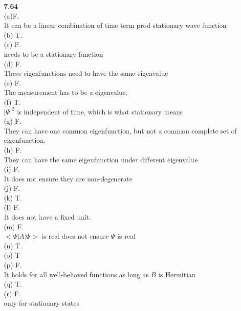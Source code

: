 \documentclass{article}
\begin{document}
\textbf{7.64}\\
(a)F.\\
It can be a linear combination of time term prod stationary wave function\\
(b) T.\\
(c) F.\\
needs to be a stationary function\\
(d) F.\\
These eigenfunctions need to have the same eigenvalue\\
(e) F.\\
The measurement has to be a eigenvalue.\\
(f) T.\\
$|\Psi|^2$ is independent of time, which is what stationary means\\
(g) F.\\
They can have one common eigenfunction, but not a common complete set of eigenfunction.\\
(h) F.\\
They can have the same eigenfunction under different eigenvalue\\
(i) F.\\
It does not ensure they are non-degenerate\\
(j) F.\\
(k) T.\\
(l) F.\\
It does not have a fixed unit.\\
(m) F.\\
$<\Psi|A|\Psi>$ is real does not ensure $\Psi$ is real\\
(n) T.\\
(o) T\\
(p) F.\\
It holds for all well-behaved functions as long as $B$ is Hermitian\\
(q) T.\\
(r) F.\\
only for stationary states\\
\newline
\end{document}
